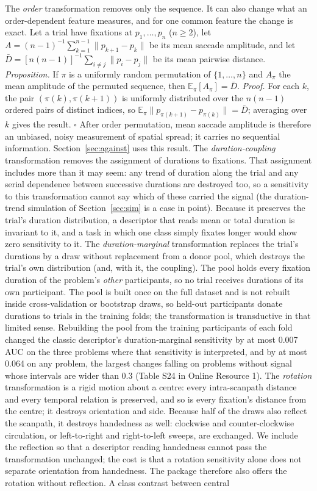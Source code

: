 The \emph{order} transformation removes only the sequence. It can also change what an order-dependent feature measures, and for one common feature the change is exact. Let a trial have fixations at $p_1,\dots,p_n$ ($n \geq 2$), let $A = (n-1)^{-1}\sum_{k=1}^{n-1}\lVert p_{k+1} - p_k\rVert$ be its mean saccade amplitude, and let $\bar D = [n(n-1)]^{-1}\sum_{i \neq j}\lVert p_i - p_j\rVert$ be its mean pairwise distance. \emph{Proposition.} If $\pi$ is a uniformly random permutation of $\{1,\dots,n\}$ and $A_\pi$ the mean amplitude of the permuted sequence, then $\mathbb{E}_\pi[A_\pi] = \bar D$. \emph{Proof.} For each $k$, the pair $(\pi(k), \pi(k+1))$ is uniformly distributed over the $n(n-1)$ ordered pairs of distinct indices, so $\mathbb{E}_\pi\lVert p_{\pi(k+1)} - p_{\pi(k)}\rVert = \bar D$; averaging over $k$ gives the result. $\square$ After order permutation, mean saccade amplitude is therefore an unbiased, noisy measurement of spatial spread; it carries no sequential information. Section~\ref{sec:against} uses this result. The \emph{duration-coupling} transformation removes the assignment of durations to fixations. That assignment includes more than it may seem: any trend of duration along the trial and any serial dependence between successive durations are destroyed too, so a sensitivity to this transformation cannot say which of these carried the signal (the duration-trend simulation of Section~\ref{sec:sim} is a case in point). Because it preserves the trial's duration distribution, a descriptor that reads mean or total duration is invariant to it, and a task in which one class simply fixates longer would show zero sensitivity to it. The \emph{duration-marginal} transformation replaces the trial's durations by a draw without replacement from a donor pool, which destroys the trial's own distribution (and, with it, the coupling). The pool holds every fixation duration of the problem's \emph{other} participants, so no trial receives durations of its own participant. The pool is built once on the full dataset and is not rebuilt inside cross-validation or bootstrap draws, so held-out participants donate durations to trials in the training folds; the transformation is transductive in that limited sense. Rebuilding the pool from the training participants of each fold changed the classic descriptor's duration-marginal sensitivity by at most 0.007 AUC on the three problems where that sensitivity is interpreted, and by at most 0.064 on any problem, the largest changes falling on problems without signal whose intervals are wider than 0.3 (Table S24 in Online Resource 1). The \emph{rotation} transformation is a rigid motion about a centre: every intra-scanpath distance and every temporal relation is preserved, and so is every fixation's distance from the centre; it destroys orientation and side. Because half of the draws also reflect the scanpath, it destroys handedness as well: clockwise and counter-clockwise circulation, or left-to-right and right-to-left sweeps, are exchanged. We include the reflection so that a descriptor reading handedness cannot pass the transformation unchanged; the cost is that a rotation sensitivity alone does not separate orientation from handedness. The package therefore also offers the rotation without reflection. A class contrast between central 